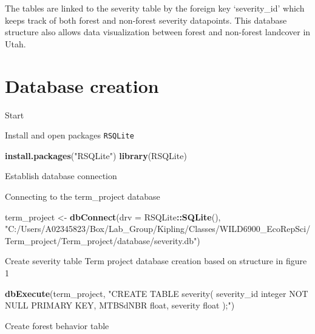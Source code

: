 \documentclass[]{book}
\newenvironment{Shaded}{\begin{snugshade}}{\end{snugshade}}
\newcommand{\DataTypeTok}[1]{\textcolor[rgb]{0.13,0.29,0.53}{#1}}
\newcommand{\KeywordTok}[1]{\textcolor[rgb]{0.13,0.29,0.53}{\textbf{#1}}}
\newcommand{\NormalTok}[1]{#1}
\newcommand{\OperatorTok}[1]{\textcolor[rgb]{0.81,0.36,0.00}{\textbf{#1}}}
\newcommand{\StringTok}[1]{\textcolor[rgb]{0.31,0.60,0.02}{#1}}
\begin{document}
The tables are linked to the severity table by the foreign key `severity\_id' which keeps track of both forest and non-forest severity datapoints. This database structure also allows data visualization between forest and non-forest landcover in Utah.

\hypertarget{creation}{%
\chapter{Database creation}\label{creation}}

Start

Install and open packages \texttt{RSQLite}

\begin{Shaded}
\begin{Highlighting}[]
\KeywordTok{install.packages}\NormalTok{(}\StringTok{"RSQLite"}\NormalTok{)}
\KeywordTok{library}\NormalTok{(RSQLite)}
\end{Highlighting}
\end{Shaded}

Establish database connection

Connecting to the term\_project database

\begin{Shaded}
\begin{Highlighting}[]
\NormalTok{term_project <-}\StringTok{ }\KeywordTok{dbConnect}\NormalTok{(}\DataTypeTok{drv =}\NormalTok{ RSQLite}\OperatorTok{::}\KeywordTok{SQLite}\NormalTok{(),}
                        \StringTok{"C:/Users/A02345823/Box/Lab_Group/Kipling/Classes/WILD6900_EcoRepSci/Term_project/Term_project/database/severity.db"}\NormalTok{)}
\end{Highlighting}
\end{Shaded}

Create severity table
Term project database creation based on structure in figure 1

\begin{Shaded}
\begin{Highlighting}[]
\KeywordTok{dbExecute}\NormalTok{(term_project, }\StringTok{"CREATE TABLE severity(}
\StringTok{severity_id integer NOT NULL PRIMARY KEY,}
\StringTok{MTBSdNBR float,}
\StringTok{severity float}
\StringTok{);"}\NormalTok{)}
\end{Highlighting}
\end{Shaded}

Create forest behavior table
\end{document}

